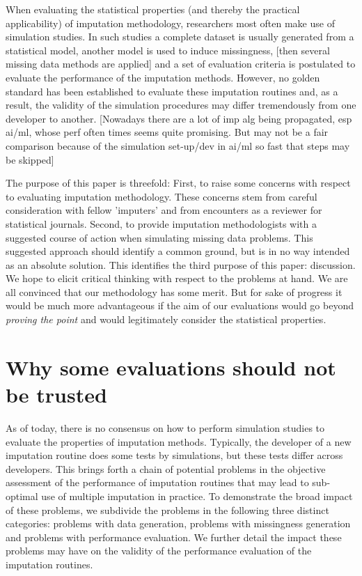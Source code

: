 \documentclass[bimj,fleqn]{w-art}
\theoremstyle{plain}
\theoremstyle{definition}
\begin{document}
When evaluating the statistical properties (and thereby the practical applicability) of imputation methodology, researchers most often make use of simulation studies. In such studies a complete dataset is usually generated from a statistical model, another model is used to induce missingness, [then several missing data methods are applied] and a set of evaluation criteria is postulated to evaluate the performance of the imputation methods. However, no golden standard has been established to evaluate these imputation routines and, as a result, the validity of the simulation procedures may differ tremendously from one developer to another. [Nowadays there are a lot of imp alg being propagated, esp ai/ml, whose perf often times seems quite promising. But may not be a fair comparison because of the simulation set-up/dev in ai/ml so fast that steps may be skipped]

The purpose of this paper is threefold: First, to raise some concerns with respect to evaluating imputation methodology. These concerns stem from careful consideration with fellow 'imputers' and from encounters as a reviewer for statistical journals. Second, to provide imputation methodologists with a suggested course of action when simulating missing data problems. This suggested approach should identify a common ground, but is in no way intended as an absolute solution. This identifies the third purpose of this paper: discussion. We hope to elicit critical thinking with respect to the problems at hand. We are all convinced that our methodology has some merit. But for sake of progress it would be much more advantageous if the aim of our evaluations would go beyond \emph{proving the point} and would legitimately consider the statistical properties. 



\section{Why some evaluations should not be trusted}

As of today, there is no consensus on how to perform simulation studies to evaluate the properties of imputation methods. Typically, the developer of a new imputation routine does some tests by simulations, but these tests differ across developers. This brings forth a chain of potential problems in the objective assessment of the performance of imputation routines that may lead to sub-optimal use of multiple imputation in practice. To demonstrate the broad impact of these problems, we subdivide the problems in the following three distinct categories: problems with data generation, problems with missingness generation and problems with performance evaluation. We further detail the impact these problems may have on the validity of the performance evaluation of the imputation routines. 
\end{document}
